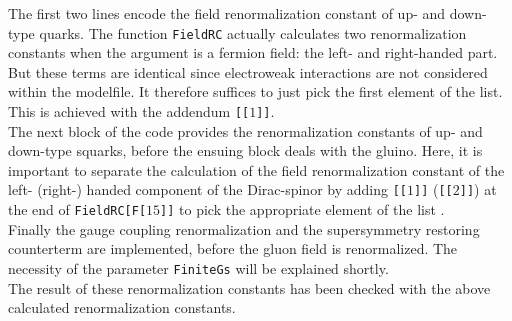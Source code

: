 The first two lines encode the field renormalization constant of up- and down-type quarks. The function \texttt{FieldRC} actually calculates two renormalization constants when the argument is a fermion field: the left- and right-handed part. But these terms are identical since electroweak interactions are not considered within the modelfile. It therefore suffices to just pick the first element of the list. This is achieved with the addendum \texttt{[[$1$]]}.\\
The next block of the code provides the renormalization constants of up- and down-type squarks, before the ensuing block deals with the gluino. Here, it is important to separate the calculation of the field renormalization constant of the left- (right-) handed component of the Dirac-spinor by adding \texttt{[[$1$]]} (\texttt{[[$2$]]}) at the end of \texttt{FieldRC[F[$15$]]} to pick the appropriate element of the list .\\
Finally the gauge coupling renormalization and the supersymmetry restoring counterterm are implemented, before the gluon field is renormalized. The necessity of the parameter \texttt{FiniteGs} will be explained shortly.\\
The result of these renormalization constants has been checked with the above calculated renormalization constants.

